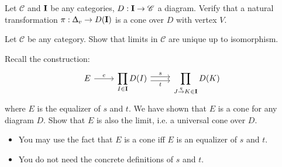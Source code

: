 \begin{exercise}
  Let $\mathscr{C}$ and $\bf{I}$ be any categories, $D : \bf{I} \to \mathscr{C}$ a diagram.
  Verify that a natural transformation $\pi : \Updelta_v \to D(\bf{I})$ is a cone over $D$ with vertex $V$.
\end{exercise}

\begin{exercise}
  Let $\mathscr{C}$ be any category. Show that limits in $\mathscr{C}$ are unique up to isomorphism.
\end{exercise}

\begin{exercise}
  Recall the construction:
  \[
    \begin{tikzcd}
      E \arrow{r}{e} &
      \displaystyle \prod_{I \in \bf{I}} D(I) \arrow[r,shift left, "s"] \arrow[r,shift right,swap,"t"] &
      \displaystyle \prod_{J \overset{q}{\to} K \in \bf{I}} D(K)
    \end{tikzcd}
  \]
  where $E$ is the equalizer of $s$ and $t$.
  We have shown that $E$ is a cone for any diagram $D$. Show that $E$ is also the limit,
  i.e. a universal cone over $D$.
\end{exercise}
\begin{hint}
  \begin{itemize}
  \item You may use the fact that $E$ is a cone iff $E$ is an equalizer of $s$ and $t$.
  \item You do not need the concrete definitions of $s$ and $t$.
  \end{itemize}
\end{hint}




